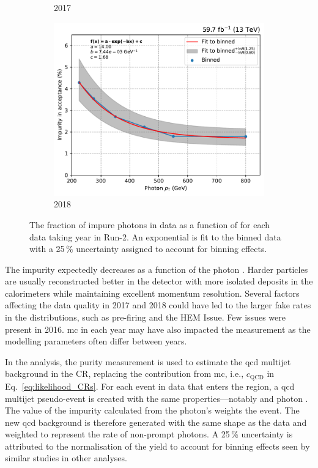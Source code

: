 \begin{figure}[htbp]
\begin{subfigure}[b]{0.32\textwidth}
        \caption{2017}
    \end{subfigure}
    \hfill
    \begin{subfigure}[b]{0.32\textwidth}
        \includegraphics[width=\textwidth]{figures/photon_purity/2018/impurity_plot_2018.pdf}
        \caption{2018}
    \end{subfigure}
    \caption[The fraction of impure photons in data as a function of \pt for each data taking year in Run-2]{The fraction of impure photons in data as a function of \pt for each data taking year in Run-2. An exponential is fit to the binned data with a 25\,\% uncertainty assigned to account for binning effects.}
    \label{fig:htoinv_photon_impurity}
\end{figure}

The impurity expectedly decreases as a function of the photon \pt. Harder particles are usually reconstructed better in the detector with more isolated deposits in the calorimeters while maintaining excellent momentum resolution. Several factors affecting the data quality in 2017 and 2018 could have led to the larger fake rates in the distributions, such as pre-firing and the HEM Issue. Few issues were present in 2016. \acrlong{mc} in each year may have also impacted the measurement as the modelling parameters often differ between years.

In the analysis, the purity measurement is used to estimate the \acrshort{qcd} multijet background in the \singlePhotonCr \gls{CR}, replacing the contribution from \acrshort{mc}, i.e., $c_{\mathrm{QCD}}$ in Eq.~\ref{eq:likelihood_CRs}. For each event in data that enters the region, a \acrshort{qcd} multijet pseudo-event is created with the same properties---notably \ptmiss and photon \pt. The value of the impurity calculated from the photon's \pt weights the event. The new \acrshort{qcd} background is therefore generated with the same shape as the data and weighted to represent the rate of non-prompt photons. A 25\,\% uncertainty is attributed to the normalisation of the yield to account for binning effects seen by similar studies in other analyses.

